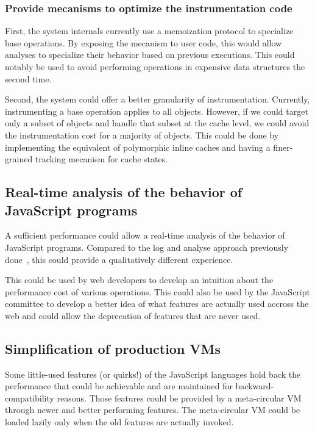 \subsubsection{Provide mecanisms to optimize the instrumentation code}

First, the system internals currently use a memoization protocol to specialize base
operations. By exposing the mecanism to user code, this would allow analyses to
specialize their behavior based on previous executions. This could notably be
used to avoid performing operations in expensive data structures the second
time.

Second, the system could offer a better granularity of instrumentation.
Currently, instrumenting a base operation applies to all objects. However, if
we could target only a subset of objects and handle that subset at the cache
level, we could avoid the instrumentation cost for a majority of objects. This
could be done by implementing the equivalent of polymorphic inline caches and
having a finer-grained tracking mecanism for cache states.

\subsection{Real-time analysis of the behavior of JavaScript programs}

A sufficient performance could allow a real-time analysis of the behavior of
JavaScript programs. Compared to the log and analyse approach previously
done~\cite{behavior_js}, this could provide a qualitatively different
experience.

This could be used by web developers to develop an intuition about the
performance cost of various operations. This could also be used by the
JavaScript committee to develop a better idea of what features are actually
used accross the web and could allow the deprecation of features that are never
used.

\subsection{Simplification of production VMs}

Some little-used features (or quirks!) of the JavaScript languages hold back
the performance that could be achievable and are maintained for
backward-compatibility reasons. Those features could be provided by a
meta-circular VM through newer and better performing features.  The
meta-circular VM could be loaded lazily only when the old features are actually
invoked.

